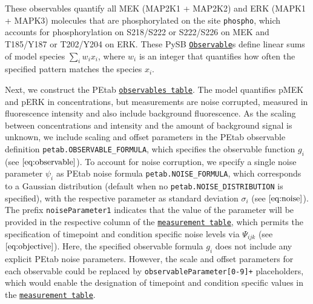 \documentclass[11pt]{article}
\begin{document}
    These observables quantify all MEK (MAP2K1 + MAP2K2) and ERK (MAPK1 +
MAPK3) molecules that are phosphorylated on the site \texttt{phospho},
which accounts for phosphorylation on S218/S222 or S222/S226 on MEK and
T185/Y187 or T202/Y204 on ERK. These PySB
\href{https://pysb.readthedocs.io/en/stable/modules/core.html\#pysb.core.Observable}{\texttt{Observable}}s
define linear sums of model species \(\sum_i w_i x_i\), where \(w_i\) is
an integer that quantifies how often the specified pattern matches the
species \(x_i\).

Next, we construct the PEtab
\href{https://petab.readthedocs.io/en/latest/documentation_data_format.html\#observables-table}{\texttt{observables\ table}}.
The model quantifies pMEK and pERK in concentrations, but measurements
are noise corrupted, measured in fluorescence intensity and also include
background fluorescence. As the scaling between concentrations and
intensity and the amount of background signal is unknown, we include
scaling and offset parameters in the PEtab observable definition
\texttt{petab.OBSERVABLE\_FORMULA}, which specifies the observable
function \(g_i\) (see \(\eqref{eq:observable}\)). To account for noise
corruption, we specify a single noise parameter \(\psi_i\) as PEtab
noise formula \texttt{petab.NOISE\_FORMULA}, which corresponds to a
Gaussian distribution (default when no
\texttt{petab.NOISE\_DISTRIBUTION} is specified), with the respective
parameter as standard deviation \(\sigma_i\) (see \(\eqref{eq:noise}\)).
The prefix \texttt{noiseParameter1} indicates that the value of the
parameter will be provided in the respective column of the
\href{https://petab.readthedocs.io/en/latest/documentation_data_format.html\#measurement-table}{\texttt{measurement\ table}},
which permits the specification of timepoint and condition specific
noise levels via \(\Psi_{ijk}\) (see \(\eqref{eq:objective}\)). Here,
the specified observable formula \(g_i\) does not include any explicit
PEtab noise parameters. However, the scale and offset parameters for
each observable could be replaced by
\texttt{observableParameter{[}0-9{]}+} placeholders, which would enable
the designation of timepoint and condition specific values in the
\href{https://petab.readthedocs.io/en/latest/documentation_data_format.html\#measurement-table}{\texttt{measurement\ table}}.
\end{document}
